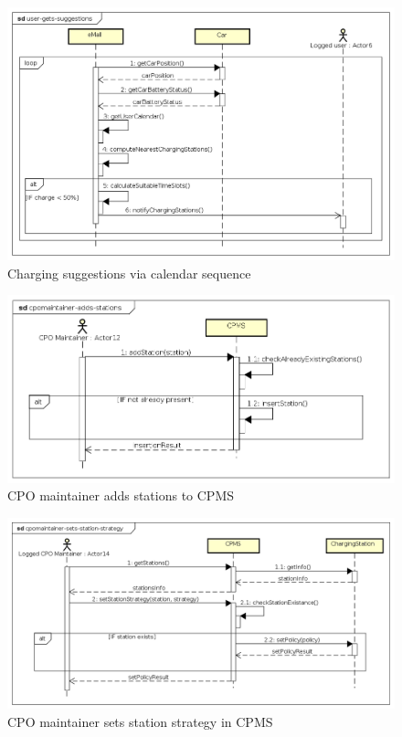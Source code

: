 \begin{figure}[!h]
    \begin{center}
        \includegraphics[keepaspectratio, width=16cm]{Sequence/user-gets-suggestions.png}
        \caption{Charging suggestions via calendar sequence}
    \end{center}
\end{figure}
\begin{figure}[!h]
    \begin{center}
        \includegraphics[keepaspectratio, width=16cm]{Sequence/cpomaintainer-adds-stations.png}
        \caption{\ac{CPO} maintainer adds stations to \ac{CPMS}}
    \end{center}
\end{figure}
\begin{figure}[!h]
    \begin{center}
        \includegraphics[keepaspectratio, width=16cm]{Sequence/cpomaintainer-sets-station-strategy.png}
        \caption{\ac{CPO} maintainer sets station strategy in \ac{CPMS}}
    \end{center}
\end{figure}


